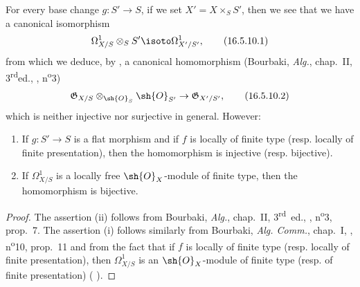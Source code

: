 \begin{env}[16.5.10]
\label{IV.16.5.10}
For every base change $g : S' \to S$, if  we set $X' = X \times_S S'$, then we see  that we have a canonical isomorphism
\[
\label{IV.16.5.10.1}
  \Omega_{X/S}^1 \otimes_S S' \isoto \Omega_{X'/S'}^1,
  \tag{16.5.10.1}
\]
from which we deduce, by , a canonical homomorphism (Bourbaki, \emph{Alg.}, chap.~II, 3\textsuperscript{rd}ed., , n\textsuperscript{o}3)
\[
\label{IV.16.5.10.2}
  \mathfrak{G}_{X/S} \otimes_{\sh{O}_S} \sh{O}_{S'} \to \mathfrak{G}_{X'/S'},
  \tag{16.5.10.2}
\]
which is neither injective nor surjective in general.
However:
\end{env}

\begin{proposition}[16.5.11]
\label{IV.16.5.11}
\begin{enumerate}
  \item[{\rm(i)}] If $g : S' \to S$ is a flat morphism and if $f$ is locally of finite type (resp. locally of finite presentation), then the homomorphism  is injective (resp. bijective).
  \item[{\rm(ii)}] If $\Omega_{X/S}^1$ is a locally free $\sh{O}_X$-module of finite type, then the homomorphism  is bijective.
\end{enumerate}
\end{proposition}

\begin{proof}
The assertion (ii) follows from Bourbaki, \emph{Alg.}, chap.~II, 3\textsuperscript{rd}~ed., , n\textsuperscript{o}3, prop.~7.
The assertion (i) follows similarly from Bourbaki, \emph{Alg. Comm.}, chap.~I, , n\textsuperscript{o}10, prop.~11 and from the fact that if $f$ is locally of finite type (resp. locally of finite presentation), then $\Omega_{X/S}^1$ is an $\sh{O}_X$-module of finite type (resp. of finite presentation) ( ).
\end{proof}

